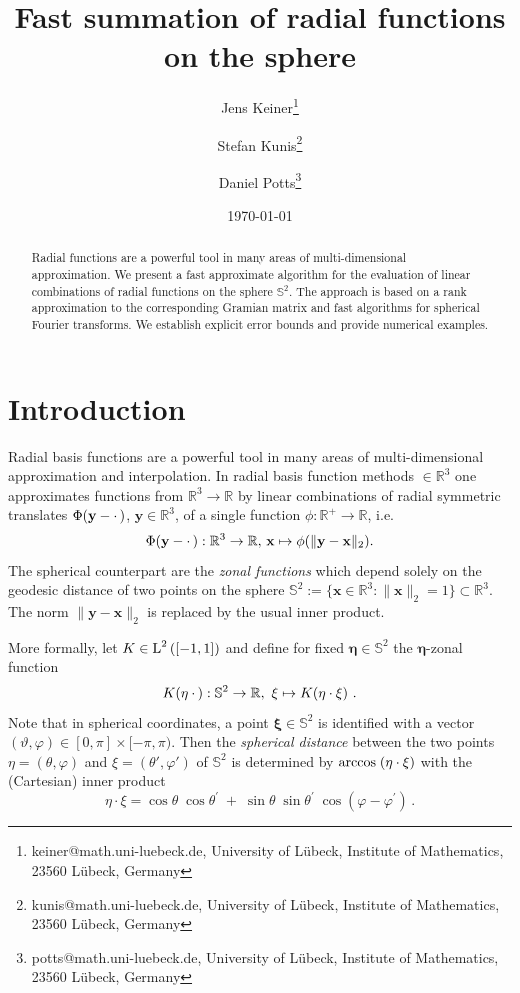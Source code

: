 \documentclass[11pt,a4paper,twoside,bibtotoc]{scrartcl}
\title{Fast summation of radial functions on the sphere}
\date{\today}
\author{
Jens Keiner\thanks{keiner@math.uni-luebeck.de, University of
  L\"ubeck, Institute of Mathematics, 23560 L\"ubeck, Germany} \and
Stefan Kunis\thanks{kunis@math.uni-luebeck.de, University of
  L\"ubeck, Institute of Mathematics, 23560 L\"ubeck, Germany} \and
Daniel Potts\thanks{potts@math.uni-luebeck.de, University of
  L\"ubeck, Institute of Mathematics, 23560 L\"ubeck, Germany} 
}
\theoremstyle{plain}
\theoremstyle{definition}
\theoremstyle{remark}
\newcommand{\R}{\ensuremath{\mathbb{R}}}
\newcommand{\Ln}[2]{\ensuremath{\text{\rm{L}}^{#1}\left(#2\right)}}
\newcommand{\fun}[2]{\ensuremath{#1{\hspace{-0.4ex}}\left(#2\right)}}
\numberwithin{equation}{section}
\numberwithin{table}{section}
\numberwithin{figure}{section}
\begin{document}
\maketitle

\begin{abstract}
\medskip
\noindent
{Radial functions are a powerful tool in many areas of multi-dimensional 
approximation. We present a fast approximate algorithm for the evaluation of
linear combinations of radial functions on the sphere $\mathbb{S}^2$. The 
approach is based on a rank approximation to the corresponding Gramian matrix
and fast algorithms for spherical Fourier transforms. We establish explicit error 
bounds and provide numerical examples.}
\end{abstract}

\section{Introduction}\label{sect:1}
Radial basis functions are a powerful tool in many areas of multi-dimensional 
approximation and interpolation.
In radial basis function methods $\in \R^3$ one approximates functions
from $\R^3 
\rightarrow \R$ by linear combinations of radial symmetric translates 
$\fun{\Phi}{\mathbf{y} - \cdot \,}$, $\mathbf{y} \in \R^3$, of a single function $\phi : \R^{+} \rightarrow \R$, i.e. 
\[
  \fun{\Phi}{\mathbf{y} - \cdot \,}:\R^3 \rightarrow \R, \, \mathbf{x} \mapsto \phi(\|\mathbf{y} - \mathbf{x}\|_2).
\]
The spherical counterpart are the \emph{zonal functions} which depend solely
on the geodesic distance of two points on the sphere $\mathbb{S}^2:=\{
\mathbf{x} \in \mathbb{R}^3: \|\mathbf{x}\|_2=1\} \subset \R^3$. The norm $\|\mathbf{y} - \mathbf{x}\|_2$ 
is replaced by the usual inner product.

More formally, let $K \in \Ln{2}{[-1,1]}$ and define for fixed
$\mathbf{\eta} \in \mathbb{S}^2$ the $\mathbf{\eta}$-zonal function 
\[
  \fun{K}{\mathbf{\eta} \: \cdot \,}: \mathbb{S}^2 \rightarrow \R,\ \mathbf{\xi} \mapsto
  \fun{K}{\mathbf{\eta} \cdot \mathbf{\xi}}\,.%
\]
Note that in spherical coordinates, a point $\mathbf{\xi} \in \mathbb{S}^2$ is identified with 
a vector $(\vartheta,\varphi) \in [0,\pi] \times [-\pi,\pi)$. 
Then the {\it spherical distance} between the two points 
$\eta=(\theta,\varphi)$ and $\xi=(\theta',\varphi')$ of $\mathbb{S}^2$ is
determined by
$
{\rm arccos}\;  (\eta\cdot \xi)                     
$
with the (Cartesian) inner product 
$$
\eta\cdot \xi = \cos\theta\; \cos \theta^\prime \; +\; \sin\theta\; \sin
\theta^\prime\;\cos(\varphi-\varphi^\prime)\, .
$$
\end{document}

